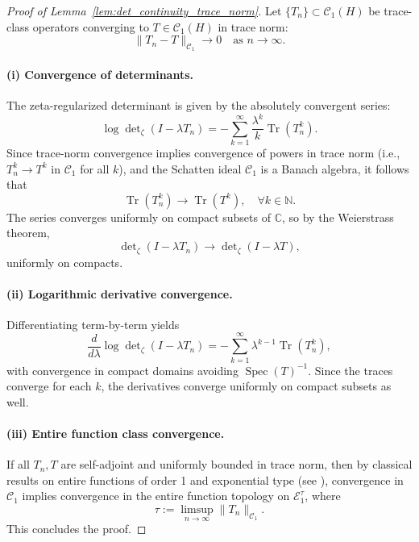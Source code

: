 \begin{proof}[Proof of Lemma~\ref{lem:det_continuity_trace_norm}]
Let \( \{ T_n \} \subset \mathcal{C}_1(H) \) be trace-class operators converging to \( T \in \mathcal{C}_1(H) \) in trace norm:
\[
\| T_n - T \|_{\mathcal{C}_1} \to 0 \quad \text{as } n \to \infty.
\]

\paragraph{(i) Convergence of determinants.}
The zeta-regularized determinant is given by the absolutely convergent series:
\[
\log \det\nolimits_\zeta(I - \lambda T_n) = - \sum_{k=1}^\infty \frac{\lambda^k}{k} \operatorname{Tr}(T_n^k).
\]
Since trace-norm convergence implies convergence of powers in trace norm (i.e., \( T_n^k \to T^k \) in \( \mathcal{C}_1 \) for all \( k \)), and the Schatten ideal \( \mathcal{C}_1 \) is a Banach algebra, it follows that
\[
\operatorname{Tr}(T_n^k) \to \operatorname{Tr}(T^k), \quad \forall k \in \mathbb{N}.
\]
The series converges uniformly on compact subsets of \( \mathbb{C} \), so by the Weierstrass theorem,
\[
\det\nolimits_\zeta(I - \lambda T_n) \to \det\nolimits_\zeta(I - \lambda T),
\]
uniformly on compacts.

\paragraph{(ii) Logarithmic derivative convergence.}
Differentiating term-by-term yields
\[
\frac{d}{d\lambda} \log \det\nolimits_\zeta(I - \lambda T_n) = - \sum_{k=1}^\infty \lambda^{k-1} \operatorname{Tr}(T_n^k),
\]
with convergence in compact domains avoiding \( \operatorname{Spec}(T)^{-1} \). Since the traces converge for each \( k \), the derivatives converge uniformly on compact subsets as well.

\paragraph{(iii) Entire function class convergence.}
If all \( T_n, T \) are self-adjoint and uniformly bounded in trace norm, then by classical results on entire functions of order 1 and exponential type (see \cite[Ch.~1]{Levin1996EntireLectures}), convergence in \( \mathcal{C}_1 \) implies convergence in the entire function topology on \( \mathcal{E}_1^\tau \), where
\[
\tau := \limsup_{n \to \infty} \| T_n \|_{\mathcal{C}_1}.
\]
This concludes the proof.
\end{proof}
% 